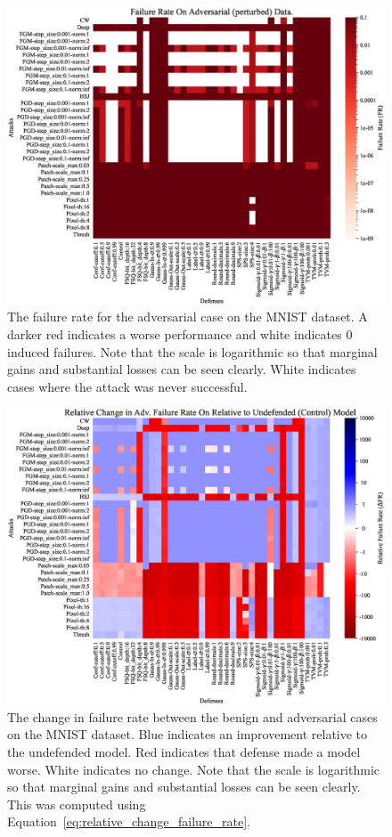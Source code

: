 \documentclass[journal]{IEEEtran}
\begin{document}
\begin{figure}[!hptb]
    {\centering
    \includegraphics[trim={0 0.85em 0 0.35em},clip,height=0.6\textwidth]{Fig21.eps}
    \vspace{-0.5em}
    \caption{The failure rate for the adversarial case on the MNIST dataset. A darker red indicates a worse performance and white indicates 0 induced failures. Note that the scale is logarithmic so that marginal gains and substantial losses can be seen clearly. White indicates cases where the attack was never successful.}
    \label{fig:mnist_rate_grid}
    } %
\end{figure}

\begin{figure}[!hptb]
    {\centering
    \includegraphics[trim={0 0.85em 0 0.35em},clip,height=0.6\textwidth]{Fig22.eps}
    \vspace{-0.5em}
    \caption{The change in failure rate between the benign and adversarial cases on the MNIST dataset. Blue indicates an improvement relative to the undefended model. Red indicates that defense made a model worse. White indicates no change. Note that the scale is logarithmic so that marginal gains and substantial losses can be seen clearly. This was computed using Equation~\ref{eq:relative_change_failure_rate}.}
    \label{fig:mnist_change_grid}
    } %
\end{figure}
\end{document}
